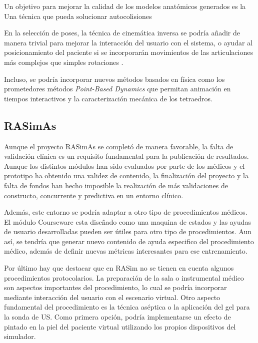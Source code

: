 Un objetivo para mejorar la calidad de los modelos anatómicos generados es la Una técnica que pueda solucionar autocolisiones \cite{Vaillant:2014}

En la selección de poses, la técnica de cinemática inversa \cite{Shi:2007} se podría añadir de manera trivial para mejorar la interacción del usuario con el sistema, o ayudar al posicionamiento del paciente si se incorporarán movimientos de las articulaciones más complejos que simples rotaciones \cite{joints}.

Incluso, se podría incorporar nuevos métodos basados en física como los prometedores métodos  \emph{Point-Based Dynamics}  \cite{abu2015position} que permitan animación en tiempos interactivos y la caracterización mecánica de los tetraedros.




\subsection{RASimAs}

Aunque el proyecto \ac{RASimAs} se completó de manera favorable, la falta de validación clínica es un requisito fundamental para la publicación de resultados. Aunque los distintos módulos han sido evaluados por parte de los médicos y el prototipo  ha obtenido una validez de contenido, la finalización del proyecto y la falta de fondos han hecho imposible la realización de más validaciones de constructo, concurrente y predictiva en un entorno clínico.  %


Además, este entorno se podría adaptar a otro tipo de procedimientos médicos. El módulo \ac{Courseware} esta diseñado como una maquina de estados y las ayudas de usuario desarrolladas pueden ser útiles para otro tipo de procedimientos. Aun así, se tendría que generar nuevo  contenido de ayuda especifico del procedimiento médico, además de definir nuevas métricas interesantes para ese entrenamiento.

Por último hay que destacar que en \ac{RASim} no se tienen en cuenta algunos procedimientos protocolarios. La preparación de la sala o instrumental médico son aspectos importantes del procedimiento, lo cual se podría incorporar mediante interacción del usuario con el escenario virtual. Otro aspecto fundamental del procedimiento es la técnica aséptica o la aplicación del gel para la sonda de \ac{US}. Como primera opción, podría implementarse un efecto de pintado en la piel del paciente virtual utilizando los propios dispositivos del simulador. 


